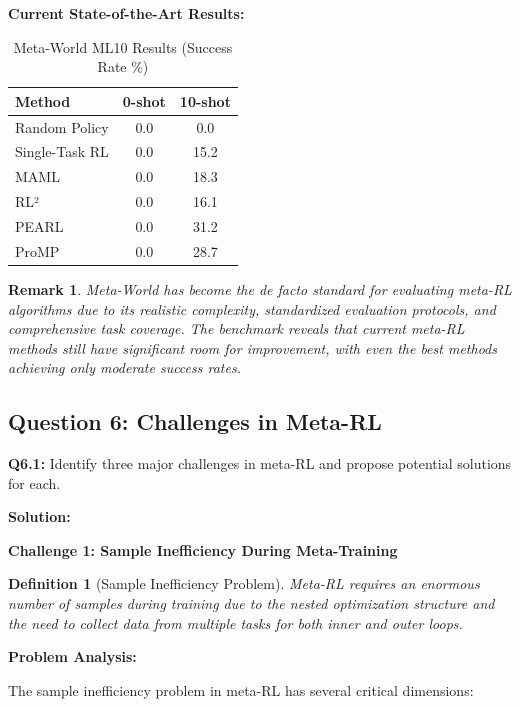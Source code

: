\documentclass[12pt]{article}
\newcommand{\ieee}[1]{\textcolor{IEEEBlue}{\textbf{#1}}}
\newtheorem{definition}{Definition}
\newtheorem{remark}{Remark}
\begin{document}
{{			\ieee{Current State-of-the-Art Results:}
			
			\begin{table}[H]
			\centering
			\caption{Meta-World ML10 Results (Success Rate \%)}
			\begin{tabular}{@{}lcc@{}}
			\toprule
			\textbf{Method} & \textbf{0-shot} & \textbf{10-shot} \\
			\midrule
			Random Policy & 0.0 & 0.0 \\
			Single-Task RL & 0.0 & 15.2 \\
			MAML & 0.0 & 18.3 \\
			RL² & 0.0 & 16.1 \\
			PEARL & 0.0 & 31.2 \\
			ProMP & 0.0 & 28.7 \\
			\bottomrule
			\end{tabular}
			\label{tab:metaworld_results}
			\end{table}
			
			\begin{remark}
			Meta-World has become the de facto standard for evaluating meta-RL algorithms due to its realistic complexity, standardized evaluation protocols, and comprehensive task coverage. The benchmark reveals that current meta-RL methods still have significant room for improvement, with even the best methods achieving only moderate success rates.
			\end{remark}
			
			\subsection{Question 6: Challenges in Meta-RL}
			
			\textbf{Q6.1:} Identify three major challenges in meta-RL and propose potential solutions for each.
			
			\textbf{Solution:}
			
			\ieee{Challenge 1: Sample Inefficiency During Meta-Training}
			
			\begin{definition}[Sample Inefficiency Problem]
			Meta-RL requires an enormous number of samples during training due to the nested optimization structure and the need to collect data from multiple tasks for both inner and outer loops.
			\end{definition}
			
			\textbf{Problem Analysis:}
			
			The sample inefficiency problem in meta-RL has several critical dimensions:
			
}}
\end{document}
